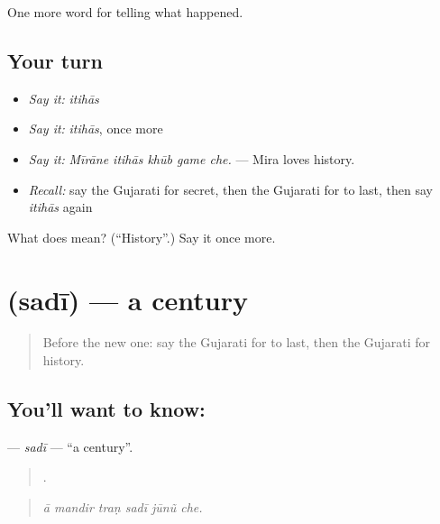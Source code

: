 \begin{grammarlens}[title={What you've built}]
One more word for telling what happened.
\end{grammarlens}

\subsection*{Your turn}
\begin{itemize}
\raggedright
  \item \emph{Say it:} \emph{itihās}
  \item \emph{Say it:} \emph{itihās}, once more
  \item \emph{Say it:} \emph{Mīrāne itihās khūb game che.} — Mira loves history.
  \item \emph{Recall:} say the Gujarati for secret, then the Gujarati for to last, then say \emph{itihās} again
\end{itemize}

\begin{tcolorbox}[breakable,colback=teal!4,colframe=teal!35!black,title={Before you move on}]
What does  mean? (\textquotedblleft{}History\textquotedblright{}.) Say it once more.
\end{tcolorbox}
\section[\texorpdfstring{\gu{સદી} (sadī)}{સદી (sadī)}]{ (sadī) — a century}

\label{lesson:GU-C317-sadi}



\begin{quote}
Before the new one: say the Gujarati for to last, then the Gujarati for history.
\end{quote}

\subsection*{You'll want to know: }
\textbf{} — \emph{sadī} — \textquotedblleft{}a century\textquotedblright{}.

\begin{quote}
     .
\end{quote}

\begin{quote}
\emph{ā mandir traṇ sadī jūnũ che.}
\end{quote}

